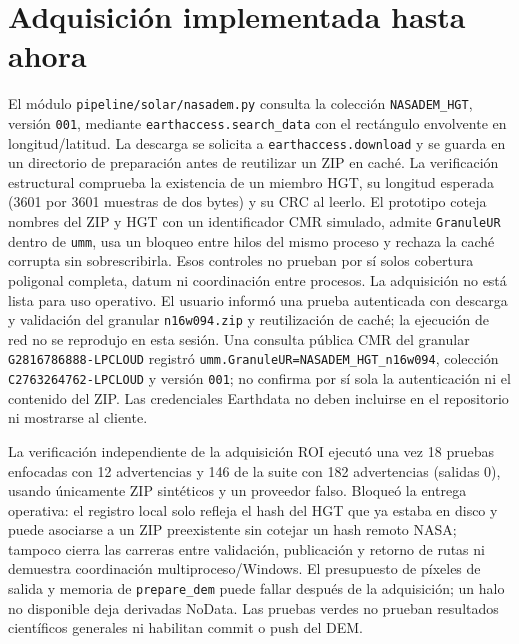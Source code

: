 \documentclass[11pt,a4paper]{article}
\begin{document}
\section{Adquisición implementada hasta ahora}
El módulo \texttt{pipeline/solar/nasadem.py} consulta la colección \texttt{NASADEM\_HGT}, versión \texttt{001}, mediante \texttt{earthaccess.search\_data} con el rectángulo envolvente en longitud/latitud. La descarga se solicita a \texttt{earthaccess.download} y se guarda en un directorio de preparación antes de reutilizar un ZIP en caché. La verificación estructural comprueba la existencia de un miembro HGT, su longitud esperada (3601 por 3601 muestras de dos bytes) y su CRC al leerlo. El prototipo coteja nombres del ZIP y HGT con un identificador CMR simulado, admite \texttt{GranuleUR} dentro de \texttt{umm}, usa un bloqueo entre hilos del mismo proceso y rechaza la caché corrupta sin sobrescribirla. Esos controles no prueban por sí solos cobertura poligonal completa, datum ni coordinación entre procesos. La adquisición no está lista para uso operativo. El usuario informó una prueba autenticada con descarga y validación del granular \texttt{n16w094.zip} y reutilización de caché; la ejecución de red no se reprodujo en esta sesión. Una consulta pública CMR del granular \texttt{G2816786888-LPCLOUD} registró \texttt{umm.GranuleUR=NASADEM\_HGT\_n16w094}, colección \texttt{C2763264762-LPCLOUD} y versión \texttt{001}; no confirma por sí sola la autenticación ni el contenido del ZIP. Las credenciales Earthdata no deben incluirse en el repositorio ni mostrarse al cliente.

La verificación independiente de la adquisición ROI ejecutó una vez 18 pruebas enfocadas con 12 advertencias y 146 de la suite con 182 advertencias (salidas 0), usando únicamente ZIP sintéticos y un proveedor falso. Bloqueó la entrega operativa: el registro local solo refleja el hash del HGT que ya estaba en disco y puede asociarse a un ZIP preexistente sin cotejar un hash remoto NASA; tampoco cierra las carreras entre validación, publicación y retorno de rutas ni demuestra coordinación multiproceso/Windows. El presupuesto de píxeles de salida y memoria de \texttt{prepare\_dem} puede fallar después de la adquisición; un halo no disponible deja derivadas NoData. Las pruebas verdes no prueban resultados científicos generales ni habilitan commit o push del DEM.
\end{document}
